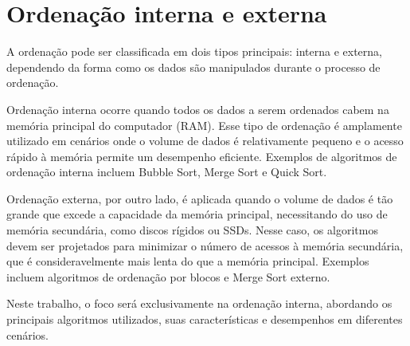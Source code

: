 \section{Ordenação interna e externa}
A ordenação pode ser classificada em dois tipos principais: interna e externa, dependendo da forma como os dados são manipulados durante o processo de ordenação.

Ordenação interna ocorre quando todos os dados a serem ordenados cabem na memória principal do computador (RAM). Esse tipo de ordenação é amplamente utilizado em cenários onde o volume de dados é relativamente pequeno e o acesso rápido à memória permite um desempenho eficiente. Exemplos de algoritmos de ordenação interna incluem Bubble Sort, Merge Sort e Quick Sort.

Ordenação externa, por outro lado, é aplicada quando o volume de dados é tão grande que excede a capacidade da memória principal, necessitando do uso de memória secundária, como discos rígidos ou SSDs. Nesse caso, os algoritmos devem ser projetados para minimizar o número de acessos à memória secundária, que é consideravelmente mais lenta do que a memória principal. Exemplos incluem algoritmos de ordenação por blocos e Merge Sort externo.

Neste trabalho, o foco será exclusivamente na ordenação interna, abordando os principais algoritmos utilizados, suas características e desempenhos em diferentes cenários.